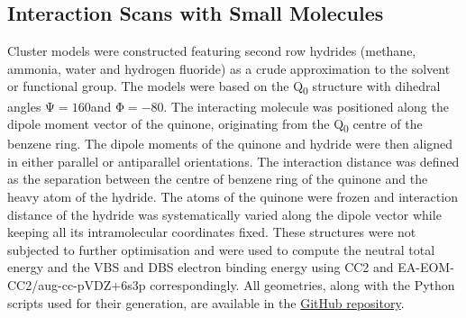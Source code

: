 \subsection{Interaction Scans with Small Molecules}

Cluster models were constructed featuring second row hydrides (methane, ammonia, water and hydrogen fluoride) as a crude approximation to the solvent or functional group.
The models were based on the Q\textsubscript{0} structure with dihedral angles $\mathrm{\Psi=160}$\degree and $\mathrm{\Phi=-80}$\degree. The interacting molecule was positioned along the dipole moment vector of the quinone, originating from the Q\textsubscript{0} centre of the benzene ring. The dipole moments of the quinone and hydride were then aligned in either parallel or antiparallel orientations. The interaction distance was defined as the separation between the centre of benzene ring of the quinone and the heavy atom of the hydride.  The atoms of the quinone were frozen and interaction distance of the hydride was systematically varied along the dipole vector while keeping all its intramolecular coordinates fixed. These structures were not subjected to further optimisation and were used to compute the neutral total energy and the VBS and DBS electron binding energy using CC2 and EA-EOM-CC2/aug-cc-pVDZ+6s3p correspondingly. All geometries, along with the Python scripts used for their generation, are available in the \href{https://github.com/EliteSushi/TCCM_Thesis}{GitHub repository}.\\

\cleardoublepage

